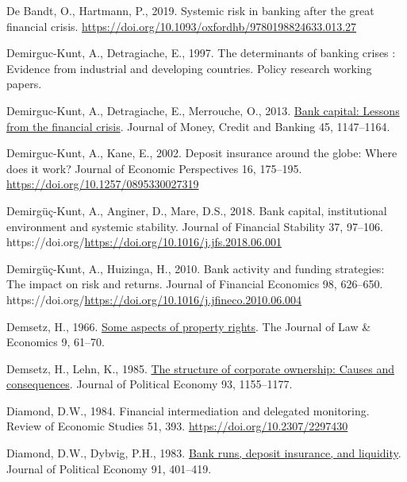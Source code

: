 \documentclass[
  letterpaper,
  DIV=11,
  numbers=noendperiod]{scrreprt}
\newlength{\cslhangindent}
\newenvironment{CSLReferences}[2] %
 {\begin{list}{}{%
  \setlength{\itemindent}{0pt}
  \setlength{\leftmargin}{0pt}
  \setlength{\parsep}{0pt}
  \ifodd #1
   \setlength{\leftmargin}{\cslhangindent}
   \setlength{\itemindent}{-1\cslhangindent}
  \fi
  \setlength{\itemsep}{#2\baselineskip}}}
 {\end{list}}
\begin{document}
\begin{CSLReferences}{1}{0}
De Bandt, O., Hartmann, P., 2019. Systemic risk in banking after the
great financial crisis.
\url{https://doi.org/10.1093/oxfordhb/9780198824633.013.27}

Demirguc-Kunt, A., Detragiache, E., 1997. The determinants of banking
crises : Evidence from industrial and developing countries. Policy
research working papers.

Demirguc-Kunt, A., Detragiache, E., Merrouche, O., 2013.
\href{http://www.jstor.org.queens.ezp1.qub.ac.uk/stable/23463595}{Bank
capital: Lessons from the financial crisis}. Journal of Money, Credit
and Banking 45, 1147--1164.

Demirguc-Kunt, A., Kane, E., 2002. Deposit insurance around the globe:
Where does it work? Journal of Economic Perspectives 16, 175--195.
\url{https://doi.org/10.1257/0895330027319}

Demirgüç-Kunt, A., Anginer, D., Mare, D.S., 2018. Bank capital,
institutional environment and systemic stability. Journal of Financial
Stability 37, 97--106.
https://doi.org/\url{https://doi.org/10.1016/j.jfs.2018.06.001}

Demirgüç-Kunt, A., Huizinga, H., 2010. Bank activity and funding
strategies: The impact on risk and returns. Journal of Financial
Economics 98, 626--650.
https://doi.org/\url{https://doi.org/10.1016/j.jfineco.2010.06.004}

Demsetz, H., 1966. \href{http://www.jstor.org/stable/724993}{Some
aspects of property rights}. The Journal of Law \& Economics 9, 61--70.

Demsetz, H., Lehn, K., 1985.
\href{http://www.jstor.org/stable/1833178}{The structure of corporate
ownership: Causes and consequences}. Journal of Political Economy 93,
1155--1177.

Diamond, D.W., 1984. Financial intermediation and delegated monitoring.
Review of Economic Studies 51, 393.
\url{https://doi.org/10.2307/2297430}

Diamond, D.W., Dybvig, P.H., 1983.
\href{http://www.jstor.org/stable/1837095}{Bank runs, deposit insurance,
and liquidity}. Journal of Political Economy 91, 401--419.


\end{CSLReferences}
\end{document}
